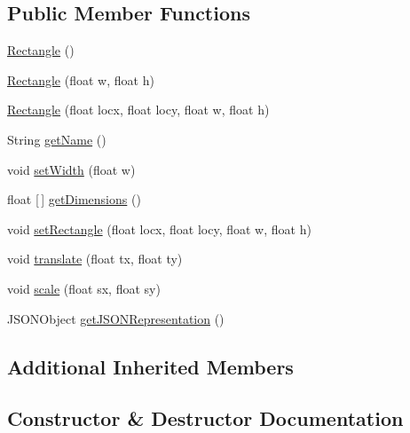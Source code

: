 \subsection*{Public Member Functions}
\begin{DoxyCompactItemize}
\item 
\hyperlink{classbridges_1_1base_1_1_rectangle_a6d80c63a14e9b94df552dac422348dc3}{Rectangle} ()
\item 
\hyperlink{classbridges_1_1base_1_1_rectangle_ae23e33dbe811d3f49b542b02d1800952}{Rectangle} (float w, float h)
\item 
\hyperlink{classbridges_1_1base_1_1_rectangle_a4df21db188c66f5635191f306a29c7e3}{Rectangle} (float locx, float locy, float w, float h)
\item 
String \hyperlink{classbridges_1_1base_1_1_rectangle_ab785b45f264ae3cd61a5a898ffa6afba}{get\+Name} ()
\item 
void \hyperlink{classbridges_1_1base_1_1_rectangle_a1c42d0e5fc64adc1c2a696c88dd6f82e}{set\+Width} (float w)
\item 
float \mbox{[}$\,$\mbox{]} \hyperlink{classbridges_1_1base_1_1_rectangle_a3d667a1ff6d7d49ba2d8560c939b3f88}{get\+Dimensions} ()
\item 
void \hyperlink{classbridges_1_1base_1_1_rectangle_a267eafb8107ea074598fbf4d2d3dc72d}{set\+Rectangle} (float locx, float locy, float w, float h)
\item 
void \hyperlink{classbridges_1_1base_1_1_rectangle_a4fed6a85f136c7946ea4e79f2553cffe}{translate} (float tx, float ty)
\item 
void \hyperlink{classbridges_1_1base_1_1_rectangle_ad2612f09cf16cd829efd13007df53f7f}{scale} (float sx, float sy)
\item 
J\+S\+O\+N\+Object \hyperlink{classbridges_1_1base_1_1_rectangle_ad9a44cbdc301594b8708769461ad4461}{get\+J\+S\+O\+N\+Representation} ()
\end{DoxyCompactItemize}
\subsection*{Additional Inherited Members}


\subsection{Constructor \& Destructor Documentation}
\mbox{\label{classbridges_1_1base_1_1_rectangle_a6d80c63a14e9b94df552dac422348dc3}} 

